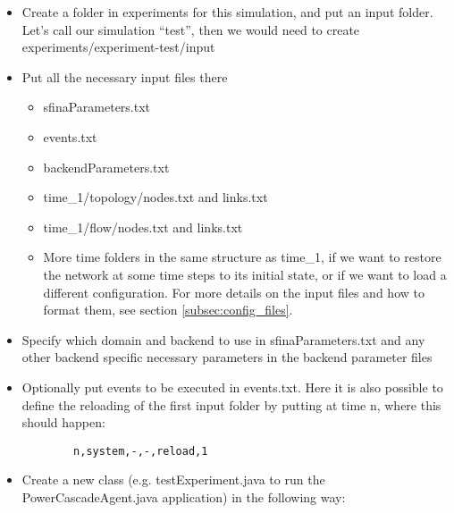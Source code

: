 \documentclass[11pt,fleqn]{book} %
\begin{document}
\begin{itemize}
	\item Create a folder in experiments for this simulation, and put an input folder. Let’s call our simulation “test”, then we would need to create experiments/experiment-test/input
	\item Put all the necessary input files there
	\begin{itemize}
		\item sfinaParameters.txt
		\item events.txt
		\item backendParameters.txt
		\item time\_1/topology/nodes.txt and links.txt
		\item time\_1/flow/nodes.txt and links.txt
		\item More time folders in the same structure as time\_1, if we want to restore the network at some time steps to its initial state, or if we want to load a different configuration. For more details on the input files and how to format them, see section \ref{subsec:config_files}.
	\end{itemize}
	\item Specify which domain and backend to use in sfinaParameters.txt and any other backend specific necessary parameters in the backend parameter files
	\item Optionally put events to be executed in events.txt. Here it is also possible to define the reloading of the first input folder by putting at time n, where this should happen:
	\begin{lstlisting}
		n,system,-,-,reload,1
	\end{lstlisting}
	\item  Create a new class (e.g. testExperiment.java to run the PowerCascadeAgent.java application) in the following way:
\end{itemize}
\end{document}
